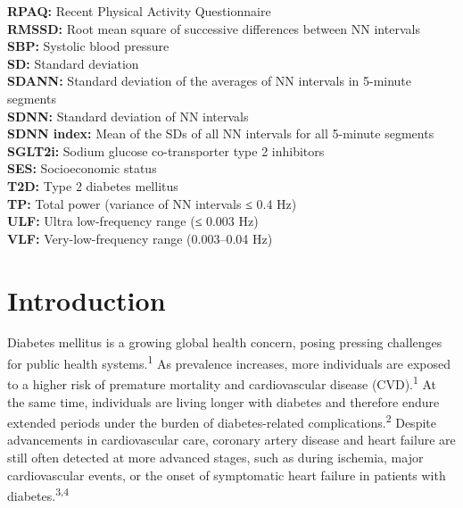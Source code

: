 \documentclass[
  a4paper,
  headsepline=true,
  open=left]{scrbook}
\begin{document}
\textbf{RPAQ:} Recent Physical Activity Questionnaire\\
\textbf{RMSSD:} Root mean square of successive differences between NN
intervals\\
\textbf{SBP:} Systolic blood pressure\\
\textbf{SD:} Standard deviation\\
\textbf{SDANN:} Standard deviation of the averages of NN intervals in
5-minute segments\\
\textbf{SDNN:} Standard deviation of NN intervals\\
\textbf{SDNN index:} Mean of the SDs of all NN intervals for all
5-minute segments\\
\textbf{SGLT2i:} Sodium glucose co-transporter type 2 inhibitors\\
\textbf{SES:} Socioeconomic status\\
\textbf{T2D:} Type 2 diabetes mellitus\\
\textbf{TP:} Total power (variance of NN intervals ≤ 0.4 Hz)\\
\textbf{ULF:} Ultra low-frequency range (≤ 0.003 Hz)\\
\textbf{VLF:} Very-low-frequency range (0.003--0.04 Hz)


\hypertarget{introduction}{%
\chapter{Introduction}\label{introduction}}

\clearpage
\null
\thispagestyle{empty}
\clearpage

Diabetes mellitus is a growing global health concern, posing pressing
challenges for public health systems.\textsuperscript{1} As prevalence
increases, more individuals are exposed to a higher risk of premature
mortality and cardiovascular disease (CVD).\textsuperscript{1} At the
same time, individuals are living longer with diabetes and therefore
endure extended periods under the burden of diabetes-related
complications.\textsuperscript{2} Despite advancements in cardiovascular
care, coronary artery disease and heart failure are still often detected
at more advanced stages, such as during ischemia, major cardiovascular
events, or the onset of symptomatic heart failure in patients with
diabetes.\textsuperscript{3,4}
\end{document}
